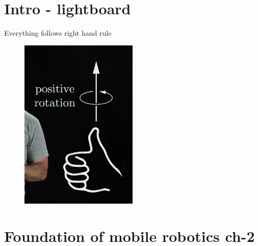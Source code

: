 \documentclass[a4paper]{article}
\begin{document}
    \section{Intro - lightboard}
    Everything follows right hand rule 
    \begin{figure}[htpb]
                      \centering
                      \includegraphics[width=0.5\textwidth]{postiveRotaion.png}
                      \caption{}
                      \label{fig:}
                  \end{figure}
    \section{Foundation of mobile robotics ch-2}
\end{document}
